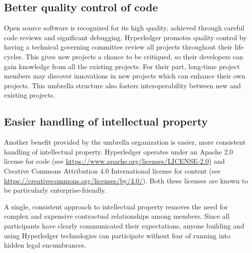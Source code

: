 \subsection{Better quality control of code}
Open source software is recognized for its high quality, achieved through careful code reviews and significant debugging. 
Hyperledger promotes quality control by having a technical governing committee review all projects throughout their life cycles.  
This gives new projects a chance to be critiqued, so their developers can gain knowledge from all the existing projects. 
For their part, long-time project members may discover innovations in new projects which can enhance their own projects. 
This umbrella structure also fosters interoperability between new and existing projects.

\subsection{Easier handling of intellectual property}
Another benefit provided by the umbrella organization is easier, more consistent handling of intellectual property. 
Hyperledger operates under an Apache 2.0 license for code (see \url{https://www.apache.org/licenses/LICENSE-2.0}) and Creative Commons Attribution 4.0 International license for content (see \url{https://creativecommons.org/licenses/by/4.0/}). 
Both these licenses are known to be particularly enterprise-friendly. 

A single, consistent approach to intellectual property removes the need for complex and expensive contractual   relationships among members. 
Since all participants have clearly communicated their expectations, anyone building and using Hyperledger technologies can participate without fear of running into hidden legal encumbrances.

